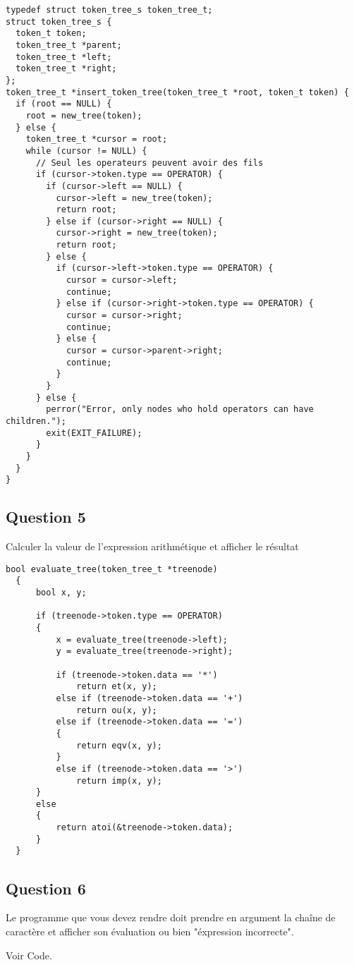\documentclass[12pt,a4paper]{article}
\begin{document}
\begin{lstlisting}[style=CStyle]
typedef struct token_tree_s token_tree_t;
struct token_tree_s {
  token_t token;
  token_tree_t *parent;
  token_tree_t *left;
  token_tree_t *right;
};
token_tree_t *insert_token_tree(token_tree_t *root, token_t token) {
  if (root == NULL) {
    root = new_tree(token);
  } else {
    token_tree_t *cursor = root;
    while (cursor != NULL) {
      // Seul les operateurs peuvent avoir des fils
      if (cursor->token.type == OPERATOR) {
        if (cursor->left == NULL) {
          cursor->left = new_tree(token);
          return root;
        } else if (cursor->right == NULL) {
          cursor->right = new_tree(token);
          return root;
        } else {
          if (cursor->left->token.type == OPERATOR) {
            cursor = cursor->left;
            continue;
          } else if (cursor->right->token.type == OPERATOR) {
            cursor = cursor->right;
            continue;
          } else {
            cursor = cursor->parent->right;
            continue;
          }
        }
      } else {
        perror("Error, only nodes who hold operators can have children.");
        exit(EXIT_FAILURE);
      }
    }
  }
}
\end{lstlisting}
\newpage
\subsection{Question 5}
Calculer la valeur de l’expression arithmétique et afficher le résultat
\begin{lstlisting}[style=CStyle]
  bool evaluate_tree(token_tree_t *treenode)
  {
      bool x, y;
  
      if (treenode->token.type == OPERATOR)
      {
          x = evaluate_tree(treenode->left);
          y = evaluate_tree(treenode->right);
  
          if (treenode->token.data == '*')
              return et(x, y);
          else if (treenode->token.data == '+')
              return ou(x, y);
          else if (treenode->token.data == '=')
          {
              return eqv(x, y);
          }
          else if (treenode->token.data == '>')
              return imp(x, y);
      }
      else
      {
          return atoi(&treenode->token.data);
      }
  }
\end{lstlisting}

\subsection{Question 6}
Le programme que vous devez rendre doit prendre en argument la chaîne de caractère et afficher son évaluation ou bien "éxpression incorrecte".

Voir Code.
\end{document}
